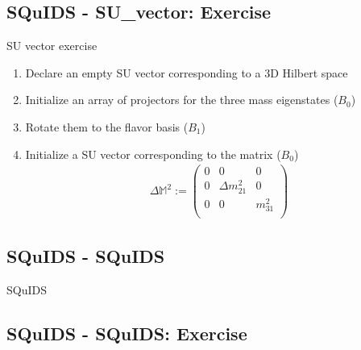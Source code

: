 \documentclass[]{beamer}
\begin{document}
\subsection{SQuIDS - SU\_vector: Exercise}

\begin{frame}
\end{frame}

\begin{frame}{SU vector exercise}
  \begin{enumerate}
    \item Declare an empty SU vector corresponding to a 3D Hilbert space
    \item Initialize an array of projectors for the three mass eigenstates (\(B_0\))
    \item Rotate them to the flavor basis (\(B_1\))
    \item Initialize a SU vector corresponding to the matrix (\(B_0\))
    \begin{align}
      \Delta \mathbb{M}^2 := \begin{pmatrix}
        0 & 0 & 0 \\
        0 & \Delta m_{21}^2 & 0 \\
        0 & 0 & m_{31}^2 \\
      \end{pmatrix}
    \end{align}
  \end{enumerate}
\end{frame}

\subsection{SQuIDS - SQuIDS}

\begin{frame}
\end{frame}

\begin{frame}{SQuIDS}
  
\end{frame}

\subsection{SQuIDS - SQuIDS: Exercise}

\begin{frame}
\end{frame}
\end{document}
